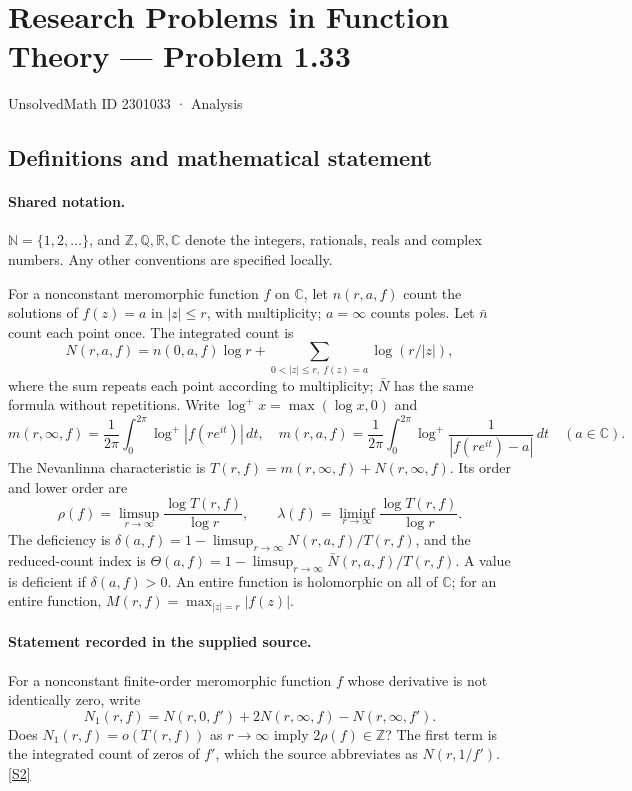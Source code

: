 \documentclass[11pt]{article}
\newcommand{\sref}[2]{\hyperlink{source:#1:#2}{[S#2]}}
\begin{document}
\setcounter{section}{2301032}
\section{Research Problems in Function Theory — Problem 1.33}\label{2301033}
{\small\sffamily UnsolvedMath ID 2301033 · Analysis}
\subsection{Definitions and mathematical statement}

\paragraph{Shared notation.}$\mathbb N=\{1,2,\ldots\}$, and $\mathbb Z,\mathbb Q,\mathbb R,\mathbb C$ denote the integers, rationals, reals and complex numbers. Any other conventions are specified locally.


For a nonconstant meromorphic function $f$ on $\mathbb C$, let $n(r,a,f)$ count the solutions of $f(z)=a$ in $|z|\le r$, with multiplicity; $a=\infty$ counts poles. Let $\bar n$ count each point once. The integrated count is
\[
 N(r,a,f)=n(0,a,f)\log r+\sum_{0<|z|\le r,\ f(z)=a}\log(r/|z|),
\]
where the sum repeats each point according to multiplicity; $\bar N$ has the same formula without repetitions. Write $\log^+x=\max(\log x,0)$ and
\[
 m(r,\infty,f)=\frac1{2\pi}\int_0^{2\pi}\log^+|f(re^{it})|\,dt,\quad
 m(r,a,f)=\frac1{2\pi}\int_0^{2\pi}\log^+\frac1{|f(re^{it})-a|}\,dt\quad(a\in\mathbb C).
\]
The Nevanlinna characteristic is $T(r,f)=m(r,\infty,f)+N(r,\infty,f)$. Its order and lower order are
\[
 \rho(f)=\limsup_{r\to\infty}\frac{\log T(r,f)}{\log r},\qquad
 \lambda(f)=\liminf_{r\to\infty}\frac{\log T(r,f)}{\log r}.
\]
The deficiency is $\delta(a,f)=1-\limsup_{r\to\infty}N(r,a,f)/T(r,f)$, and the reduced-count index is $\Theta(a,f)=1-\limsup_{r\to\infty}\bar N(r,a,f)/T(r,f)$. A value is deficient if $\delta(a,f)>0$. An entire function is holomorphic on all of $\mathbb C$; for an entire function, $M(r,f)=\max_{|z|=r}|f(z)|$.
\paragraph{Statement recorded in the supplied source.}
For a nonconstant finite-order meromorphic function $f$ whose derivative is not identically zero, write
\[
 N_1(r,f)=N(r,0,f')+2N(r,\infty,f)-N(r,\infty,f').
\]
Does $N_1(r,f)=o(T(r,f))$ as $r\to\infty$ imply $2\rho(f)\in\mathbb Z$? The first term is the integrated count of zeros of $f'$, which the source abbreviates as $N(r,1/f')$. \sref{2301033}{2}
\end{document}
